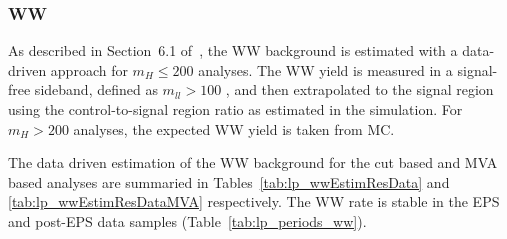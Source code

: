 \subsubsection{WW}

As described in Section~6.1 of~\cite{epsnote}, the WW background is estimated with a data-driven approach for $m_H\leq200$ \GeVcc analyses.
The WW yield is measured in a signal-free sideband, defined as $m_{ll}>100$ \GeVcc, and then extrapolated to the signal region using the
control-to-signal region ratio as estimated in the simulation. For $m_H>200$ \GeVcc analyses, the expected WW yield is taken from MC. 

The data driven estimation of the WW background for the cut based and MVA based analyses 
are summaried in Tables~\ref{tab:lp_wwEstimResData} and \ref{tab:lp_wwEstimResDataMVA} respectively. 
The WW rate is stable in the EPS and post-EPS data samples (Table~\ref{tab:lp_periods_ww}).

